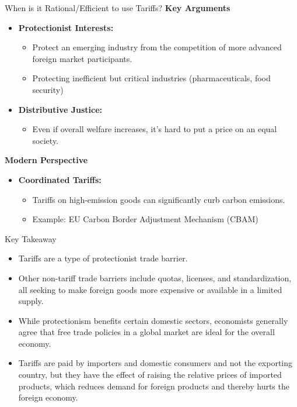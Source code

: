 \documentclass{beamer}
\begin{document}
\begin{frame}{When is it Rational/Efficient to use Tariffs?}
    \textbf{Key Arguments}
\begin{itemize} \small
    \item \textbf{Protectionist Interests:}
    \begin{itemize} \footnotesize
        \item Protect an emerging industry from the competition of more advanced foreign market participants.
        \item Protecting inefficient but critical industries (pharmaceuticals, food security)
    \end{itemize}
    \item \textbf{Distributive Justice:}
    \begin{itemize} \footnotesize
        \item Even if overall welfare increases, it's hard to put a price on an equal society. 
    \end{itemize}
\end{itemize}
\textbf{Modern Perspective}
\begin{itemize} \small
    \item \textbf{Coordinated Tariffs:}
    \begin{itemize} \footnotesize
        \item Tariffs on high-emission goods can significantly curb carbon emissions.
        \item Example: EU Carbon Border Adjustment Mechanism (CBAM) 
    \end{itemize}
\end{itemize}
\end{frame}


\begin{frame}{Key Takeaway}
    \begin{tcolorbox}
        \begin{itemize}
            \item Tariffs are a type of protectionist trade barrier.
                \item Other non-tariff trade barriers include quotas, licenses, and standardization, all seeking to make foreign goods more expensive or available in a limited supply. 
    \item While protectionism benefits certain domestic sectors, economists generally agree that free trade policies in a global market are ideal for the overall economy.
    \item Tariffs are paid by importers and domestic consumers and not the exporting country, but they have the effect of raising the relative prices of imported products, which reduces demand for foreign products and thereby hurts the foreign economy.
        \end{itemize}
    \end{tcolorbox}
\end{frame}
\end{document}
